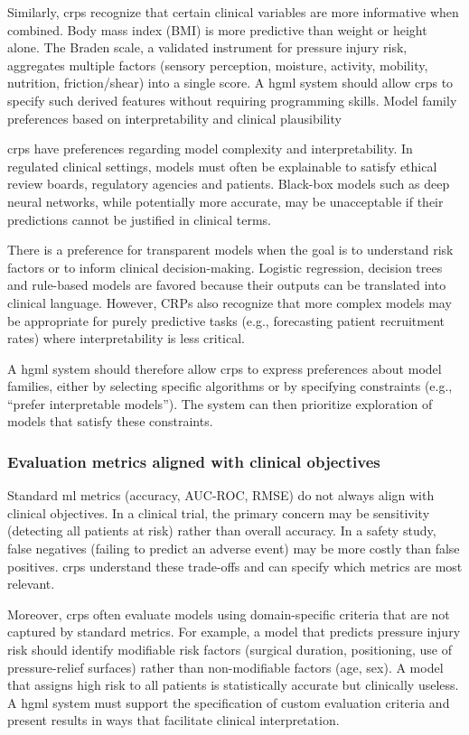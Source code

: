 \documentclass[twoside,final]{Contexto}
\begin{document}
Similarly, \glspl{crp} recognize that certain clinical variables are more informative when combined. Body mass index (BMI) is more predictive than weight or height alone. The Braden scale, a validated instrument for pressure injury risk, aggregates multiple factors (sensory perception, moisture, activity, mobility, nutrition, friction/shear) into a single score. A \gls{hgml} system should allow \glspl{crp} to specify such derived features without requiring programming skills.
Model family preferences based on interpretability and clinical plausibility

\glspl{crp} have preferences regarding model complexity and interpretability. In regulated clinical settings, models must often be explainable to satisfy ethical review boards, regulatory agencies and patients. Black-box models such as deep neural networks, while potentially more accurate, may be unacceptable if their predictions cannot be justified in clinical terms.

There is a preference for transparent models when the goal is to understand risk factors or to inform clinical decision-making. Logistic regression, decision trees and rule-based models are favored because their outputs can be translated into clinical language. However, CRPs also recognize that more complex models may be appropriate for purely predictive tasks (e.g., forecasting patient recruitment rates) where interpretability is less critical.

A \gls{hgml} system should therefore allow \glspl{crp} to express preferences about model families, either by selecting specific algorithms or by specifying constraints (e.g., ``prefer interpretable models''). The system can then prioritize exploration of models that satisfy these constraints.

\subsubsection{Evaluation metrics aligned with clinical objectives}

Standard \gls{ml} metrics (accuracy, AUC-ROC, RMSE) do not always align with clinical objectives. In a clinical trial, the primary concern may be sensitivity (detecting all patients at risk) rather than overall accuracy. In a safety study, false negatives (failing to predict an adverse event) may be more costly than false positives. \glspl{crp} understand these trade-offs and can specify which metrics are most relevant.

Moreover, \glspl{crp} often evaluate models using domain-specific criteria that are not captured by standard metrics. For example, a model that predicts pressure injury risk should identify modifiable risk factors (surgical duration, positioning, use of pressure-relief surfaces) rather than non-modifiable factors (age, sex). A model that assigns high risk to all patients is statistically accurate but clinically useless. A \gls{hgml} system must support the specification of custom evaluation criteria and present results in ways that facilitate clinical interpretation.
\end{document}
